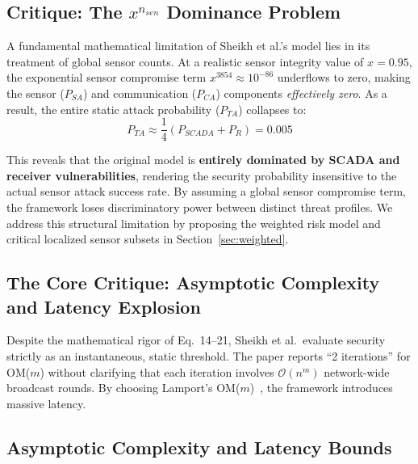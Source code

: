 \documentclass[10pt,twocolumn,letterpaper]{article}
\begin{document}
\subsection{Critique: The $x^{n_{sen}}$ Dominance Problem}
\label{sec:dominance}

A fundamental mathematical limitation of Sheikh et al.'s model lies in its treatment of global sensor counts. At a realistic sensor integrity value of $x = 0.95$, the exponential sensor compromise term $x^{3854} \approx 10^{-86}$ underflows to zero, making the sensor ($P_{SA}$) and communication ($P_{CA}$) components \emph{effectively zero}. As a result, the entire static attack probability ($P_{TA}$) collapses to:
\begin{equation}
P_{TA} \approx \frac{1}{4}(P_{SCADA} + P_R) = 0.005
\end{equation}

This reveals that the original model is \textbf{entirely dominated by SCADA and receiver vulnerabilities}, rendering the security probability insensitive to the actual sensor attack success rate. By assuming a global sensor compromise term, the framework loses discriminatory power between distinct threat profiles. We address this structural limitation by proposing the weighted risk model and critical localized sensor subsets in Section~\ref{sec:weighted}.

\subsection{The Core Critique: Asymptotic Complexity and Latency Explosion}
\label{sec:critique}

Despite the mathematical rigor of Eq.~14--21, Sheikh et al.\ evaluate security strictly as an instantaneous, static threshold. The paper reports ``2 iterations'' for OM($m$) without clarifying that each iteration involves $\mathcal{O}(n^m)$ network-wide broadcast rounds. By choosing Lamport's OM($m$)~\cite{lamport1982}, the framework introduces massive latency.

\subsection{Asymptotic Complexity and Latency Bounds}
\end{document}
